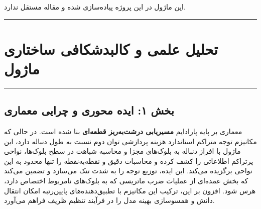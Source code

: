 \clearpage
{}
\vspace*{0.2cm}

این ماژول در این پروژه پیاده‌سازی شده و مقاله مستقل ندارد.
\noindent\rule{\textwidth}{1.2pt}
\vspace*{0.1cm}
\section{تحلیل علمی و کالبدشکافی ساختاری ماژول }
\label{sec:mod_xattention}
\vspace*{-0.2cm}
\noindent\rule{\textwidth}{0.5pt}
\vspace*{0.3cm}

\subsection*{بخش ۱: ایده محوری و چرایی معماری }
معماری  بر پایه پارادایم \textbf{مسیریابی درشت‌به‌ریز قطعه‌ای } بنا شده است. در حالی که مکانیزم توجه متراکم استاندارد هزینه پردازشی توان دوم نسبت به طول دنباله دارد، این ماژول با افراز دنباله به بلوک‌های مجزا و محاسبه شباهت در سطح بلوک‌ها، نواحی پر‌تراکم اطلاعاتی را کشف کرده و محاسبات دقیق و نقطه‌به‌نقطه را تنها محدود به این نواحی برگزیده می‌کند. این ایده، توزیع توجه را به شدت تنک می‌سازد و تضمین می‌کند که بخش عمده‌ای از عملیات ضرب ماتریسی که به بلوک‌های نامربوط اختصاص دارد، هرس شود. افزون بر این، ترکیب این مکانیزم با تطبیق‌دهنده‌های پایین‌رتبه  امکان انتقال دانش و همسوسازی بهینه مدل را در فرآیند تنظیم ظریف فراهم می‌آورد.

